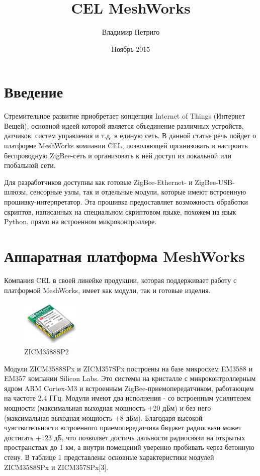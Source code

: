 \documentclass[11pt]{article}
\title{CEL MeshWorks}
\author{Владимир Петриго}
\date{Ноябрь 2015}
\begin{document}
\maketitle

\section{Введение}

Стремительное развитие приобретает концепция Internet of Things (Интернет Вещей),
основной идеей которой является объединение различных устройств, датчиков, систем
управления и т.д. в единую сеть. В данной статье речь пойдет о платформе MeshWorks 
компании CEL, позволяющей организовать и настроить беспроводную ZigBee-сеть и организовать
к ней доступ из локальной или глобальной сети.

Для разработчиков доступны как готовые ZigBee-Ethernet- и ZigBee-USB-шлюзы, 
сенсорные узлы, так и отдельные модули, которые имеют встроенную 
прошивку-интерпретатор. Эта прошивка предоставляет возможность обработки скриптов, 
написанных на специальном скриптовом языке, похожем на язык Python, прямо на 
встроенном микроконтроллере. 
\section{Аппаратная платформа MeshWorks}

Компания CEL в своей линейке продукции, которая поддерживает работу с платформой 
MeshWorks, имеет как модули, так и готовые изделия.
\begin{figure}
  \begin{center}
    \includegraphics[width=0.25\textwidth]{mc_em358x_mini.jpg}
  \end{center}
  \caption{ZICM3588SP2}
\end{figure}
Модули ZICM3588SPx и ZICM357SPx построены на базе микросхем EM3588 и EM357 компании
Silicon Labs. Это системы на кристалле с микроконтроллерным ядром ARM Cortex-M3 и
встроенным ZigBee-приемопередатчиком, работающем на частоте 2.4 ГГц. Модули имеют
два исполнения - со встроенным усилителем мощности (максимальная выходная мощность
+20 дБм) и без него (максимальная выходная мощность +8 дБм). Благодаря высокой 
чувствительности встроенного приемопередатчика бюджет радиосвязи может достигать 
+123 дБ, что позволяет достичь дальности радиосвязи на открытых пространствах до 1 км,
а внутри помещений уверенно пробивать через бетонную стену. В таблице 1 представлены
основные характеристики модулей ZICM3588SPx и ZICM357SPx[3].
\end{document}
